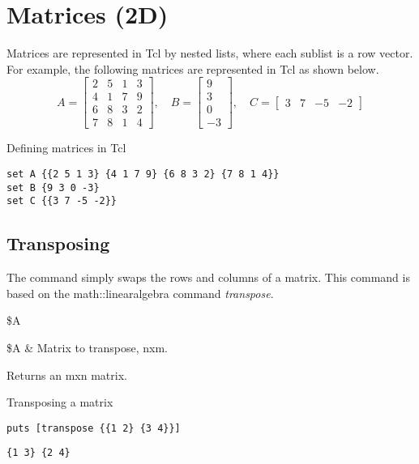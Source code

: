 \clearpage
\section{Matrices (2D)}
Matrices are represented in Tcl by nested lists, where each sublist is a row vector.
For example, the following matrices are represented in Tcl as shown below.
\begin{equation*}\label{eq:matrix_AB}
A=\begin{bmatrix}
2 & 5 & 1 & 3 \\
4 & 1 & 7 & 9 \\
6 & 8 & 3 & 2 \\
7 & 8 & 1 & 4
\end{bmatrix},\quad
B=\begin{bmatrix}
9 \\ 3 \\ 0 \\ -3
\end{bmatrix},\quad
C = \begin{bmatrix}
3 & 7 & -5 & -2
\end{bmatrix}
\end{equation*}
\begin{example}[label=ex:matrix_AB]{Defining matrices in Tcl}
\begin{lstlisting}
set A {{2 5 1 3} {4 1 7 9} {6 8 3 2} {7 8 1 4}}
set B {9 3 0 -3}
set C {{3 7 -5 -2}}
\end{lstlisting}
\end{example}
\subsection{Transposing}
The command  simply swaps the rows and columns of a matrix. This command is based on the math::linearalgebra command \textit{transpose}.
\begin{syntax}
 \$A
\end{syntax}
\begin{args}
\$A & Matrix to transpose, nxm.
\end{args}
Returns an mxn matrix.
\begin{example}{Transposing a matrix}
\begin{lstlisting}
puts [transpose {{1 2} {3 4}}]
\end{lstlisting}
\tcblower
\begin{lstlisting}
{1 3} {2 4}
\end{lstlisting}
\end{example}
\clearpage
